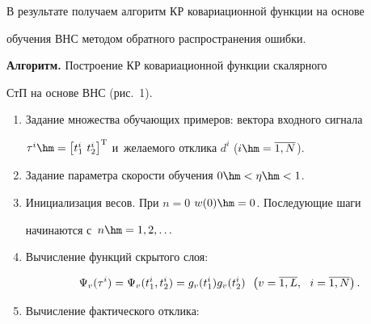   В результате получаем алгоритм КР ковариационной функции на основе 


обучения ВНС методом обратного распространения ошибки. 





\pagebreak


  


  \textbf{Алгоритм.} Построение КР ковариационной функции скалярного 


СтП на основе ВНС (рис.~1).\\[-13pt]


  \begin{enumerate}[1.]


\item Задание множества обучающих примеров: вектора входного сигнала 


$\tau^i\hm= \left[ t_1^i\ t_2^i\right]^{\mathrm{T}}$ и~желаемого отклика $d^i$ ($i\hm= 


\overline{1,N}$).\\[-13pt]


\item Задание параметра скорости обучения $0\hm< \eta\hm<1$.\\[-13pt]


\item Инициализация весов. При $n=0$ $w(0)\hm=0$. Последующие шаги 


начинаются с~$n\hm= 1,2,\ldots$\\[-13pt]


\item Вычисление функций скрытого слоя:





\noindent 


$$


\Psi_v(\tau^i) = \Psi_v(t_1^i, t_2^i) = g_v(t_1^i) g_v(t_2^i)\enskip \left(v= \overline{1,L},\ \ i= 


\overline{1,N}\right).


$$





\vspace*{-2pt}





\item Вычисление фактического отклика: 






\end{enumerate}
